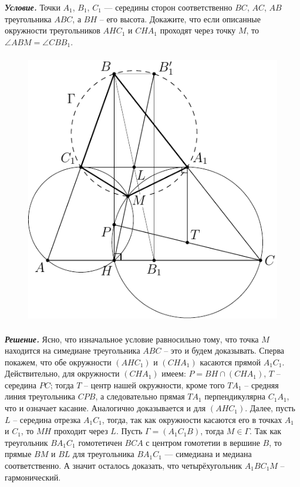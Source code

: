 \documentclass[14pt]{extarticle}
\begin{document}
\textbf{\textit{Условие.}} Точки \(A_1\), \(B_1\), \(C_1\) --- середины сторон соответственно \(BC\), \(AC\), \(AB\) 
треугольника \(ABC\), а \(BH\) -- его высота. 
Докажите, что если описанные окружности 
треугольников \(AHC_1\) и \(CHA_1\) проходят через 
точку \(M\), то \(\angle ABM = \angle CBB_1\).

\begin{figure}[H]
    \centering
    \includegraphics[height=12cm]{fig.pdf}
\end{figure}

\textbf{\textit{Решение.}} Ясно, что изначальное условие равносильно тому, что
точка \(M\) находится на симедиане треугольника 
\(ABC\) -- это и будем доказывать.
Сперва покажем, что обе окружности \((AHC_1)\) и \((CHA_1)\) 
касаются прямой \(A_1C_1\). Действительно, для окружности \((CHA_1)\) 
имеем: \(P = BH \cap (CHA_1) \), \(T\) -- середина
\(PC\); тогда \(T\) -- центр нашей окружности, 
кроме того \(TA_1\) -- средняя линия треугольника 
\(CPB\), а следовательно прямая \(TA_1\) 
перпендикулярна \(C_1A_1\), что и означает касание. Аналогично доказывается и для \((AHC_1)\). Далее, пусть \(L\) -- середина отрезка \(A_1C_1\), 
тогда, так как окружности касаются его в точках 
\(A_1\) и \(C_1\), то \(MH\) проходит через \(L\).
Пусть \(\Gamma = (A_1C_1B)\), тогда \(M \in \Gamma\). Так как треугольник 
\(BA_1C_1\) гомотетичен \(BCA\) с центром гомотетии в вершине \(B\), то 
прямые \(BM\) и \(BL\) для треугольника \(BA_1C_1\) 
--- симедиана и медиана 
соответственно. А значит осталось доказать, что четырёхугольник \(A_1BC_1M\) -- гармонический. 
\end{document}
